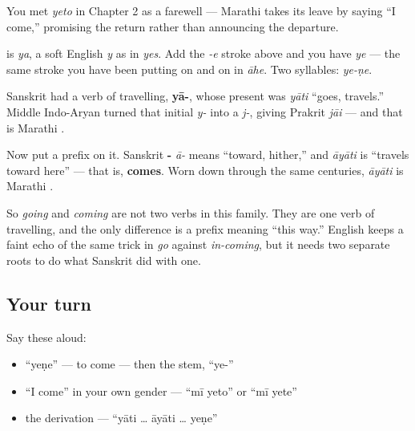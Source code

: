 You met \emph{yeto} in Chapter 2 as a farewell — Marathi takes its leave by saying \textquotedblleft{}I come,\textquotedblright{} promising the return rather than announcing the departure.

\begin{sounds}
\textbf{} is \emph{ya}, a soft English \emph{y} as in \emph{yes}. Add the \emph{-e} stroke above and you have \textbf{} \emph{ye} — the same stroke you have been putting on \textbf{} and on \textbf{} in \emph{āhe}. Two syllables: \emph{ye-ṇe}.
\end{sounds}

\begin{cousinweb}
Sanskrit had a verb of travelling, \textbf{yā-}, whose present was \textbf{} \emph{yāti} \textquotedblleft{}goes, travels.\textquotedblright{} Middle Indo-Aryan turned that initial \emph{y-} into a \emph{j-}, giving Prakrit \emph{jāi} — and that is Marathi \textbf{}.

Now put a prefix on it. Sanskrit \textbf{-} \emph{ā-} means \textquotedblleft{}toward, hither,\textquotedblright{} and \textbf{} \emph{āyāti} is \textquotedblleft{}travels toward here\textquotedblright{} — that is, \textbf{comes}. Worn down through the same centuries, \emph{āyāti} is Marathi \textbf{}.

So \emph{going} and \emph{coming} are not two verbs in this family. They are one verb of travelling, and the only difference is a prefix meaning \textquotedblleft{}this way.\textquotedblright{} English keeps a faint echo of the same trick in \emph{go} against \emph{in-coming}, but it needs two separate roots to do what Sanskrit did with one.
\end{cousinweb}

\subsection*{Your turn}
Say these aloud:

\begin{itemize}
\raggedright
  \item \textquotedblleft{}yeṇe\textquotedblright{} — to come — then the stem, \textquotedblleft{}ye-\textquotedblright{}
  \item \textquotedblleft{}I come\textquotedblright{} in your own gender — \textquotedblleft{}mī yeto\textquotedblright{} or \textquotedblleft{}mī yete\textquotedblright{}
  \item the derivation — \textquotedblleft{}yāti … āyāti … yeṇe\textquotedblright{}
\end{itemize}

